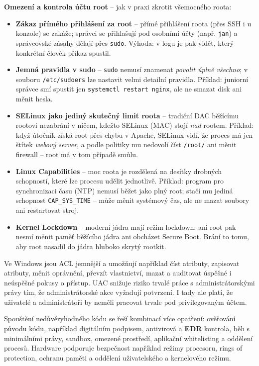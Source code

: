 \documentclass[11pt,a4paper]{article}
\begin{document}
\begin{notebox}
\textbf{Omezení a kontrola účtu root} -- jak v praxi zkrotit všemocného roota:
\begin{itemize}
  \item \textbf{Zákaz přímého přihlášení za root} -- přímé přihlášení roota (přes SSH i u konzole) se zakáže; správci se přihlašují pod osobními účty (např. \texttt{jan}) a správcovské zásahy dělají přes \texttt{sudo}. Výhoda: v logu je pak vidět, který konkrétní člověk příkaz spustil.
  \item \textbf{Jemná pravidla v sudo} -- \texttt{sudo} nemusí znamenat \emph{povolit úplně všechno}; v souboru \texttt{/etc/sudoers} lze nastavit velmi detailní pravidla. Příklad: juniorní správce smí spustit jen \texttt{systemctl restart nginx}, ale ne smazat disk ani měnit hesla.
  \item \textbf{SELinux jako jediný skutečný limit roota} -- tradiční DAC běžícímu rootovi nezabrání v ničem, kdežto SELinux (MAC) stojí \emph{nad} rootem. Příklad: když útočník získá root přes chybu v Apache, SELinux vidí, že proces má jen štítek \emph{webový server}, a podle politiky mu nedovolí číst \texttt{/root/} ani měnit firewall -- root má v tom případě smůlu.
  \item \textbf{Linux Capabilities} -- moc roota je rozdělená na desítky drobných schopností, které lze procesu udělit jednotlivě. Příklad: program pro synchronizaci času (NTP) nemusí běžet jako plný root; stačí mu jediná schopnost \texttt{CAP\_SYS\_TIME} -- může měnit systémový čas, ale ne mazat soubory ani restartovat stroj.
  \item \textbf{Kernel Lockdown} -- moderní jádra mají režim lockdown: ani root pak nesmí měnit paměť běžícího jádra ani obcházet Secure Boot. Brání to tomu, aby root nasadil do jádra hluboko skrytý rootkit.
\end{itemize}
\end{notebox}

Ve Windows jsou ACL jemnější a umožňují například číst atributy, zapisovat atributy, měnit oprávnění, převzít vlastnictví, mazat a auditovat úspěšné i neúspěšné pokusy o přístup. UAC snižuje riziko trvalé práce s administrátorskými právy tím, že administrátorské akce vyžadují potvrzení. I tady ale platí, že uživatelé a administrátoři by neměli pracovat trvale pod privilegovaným účtem.

Spouštění nedůvěryhodného kódu se řeší kombinací více opatření: ověřování původu kódu, například digitálním podpisem, antivirová a \textbf{EDR} kontrola, běh s minimálními právy, sandbox, omezené prostředí, aplikační whitelisting a oddělení procesů. Hardware podporuje bezpečnost například režimy procesoru, rings of protection, ochranu paměti a oddělení uživatelského a kernelového režimu.
\end{document}
